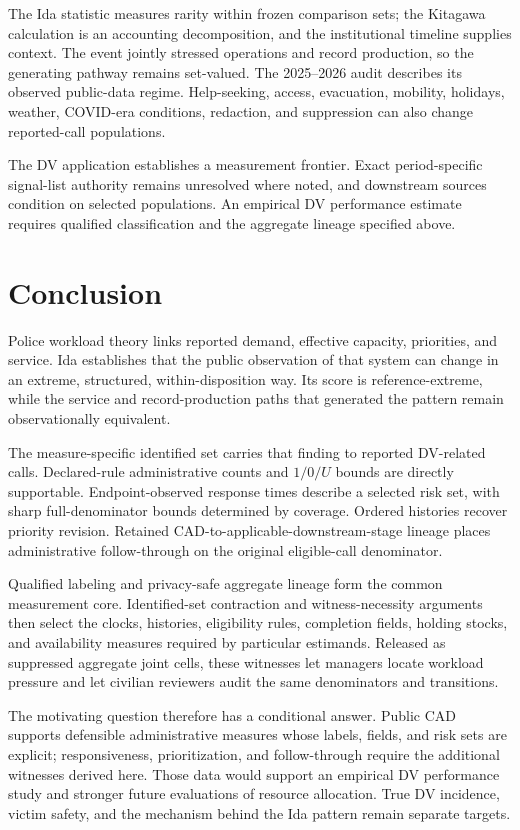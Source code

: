 \documentclass[11pt]{article}
\begin{document}
The Ida statistic measures rarity within frozen comparison sets; the Kitagawa calculation is an accounting decomposition, and the institutional timeline supplies context. The event jointly stressed operations and record production, so the generating pathway remains set-valued. The 2025--2026 audit describes its observed public-data regime. Help-seeking, access, evacuation, mobility, holidays, weather, COVID-era conditions, redaction, and suppression can also change reported-call populations.

The DV application establishes a measurement frontier. Exact period-specific signal-list authority remains unresolved where noted, and downstream sources condition on selected populations. An empirical DV performance estimate requires qualified classification and the aggregate lineage specified above.

\section{Conclusion}

Police workload theory links reported demand, effective capacity, priorities, and service. Ida establishes that the public observation of that system can change in an extreme, structured, within-disposition way. Its score is reference-extreme, while the service and record-production paths that generated the pattern remain observationally equivalent.

The measure-specific identified set carries that finding to reported DV-related calls. Declared-rule administrative counts and $1/0/U$ bounds are directly supportable. Endpoint-observed response times describe a selected risk set, with sharp full-denominator bounds determined by coverage. Ordered histories recover priority revision. Retained CAD-to-applicable-downstream-stage lineage places administrative follow-through on the original eligible-call denominator.

Qualified labeling and privacy-safe aggregate lineage form the common measurement core. Identified-set contraction and witness-necessity arguments then select the clocks, histories, eligibility rules, completion fields, holding stocks, and availability measures required by particular estimands. Released as suppressed aggregate joint cells, these witnesses let managers locate workload pressure and let civilian reviewers audit the same denominators and transitions.

The motivating question therefore has a conditional answer. Public CAD supports defensible administrative measures whose labels, fields, and risk sets are explicit; responsiveness, prioritization, and follow-through require the additional witnesses derived here. Those data would support an empirical DV performance study and stronger future evaluations of resource allocation. True DV incidence, victim safety, and the mechanism behind the Ida pattern remain separate targets.



\end{document}
